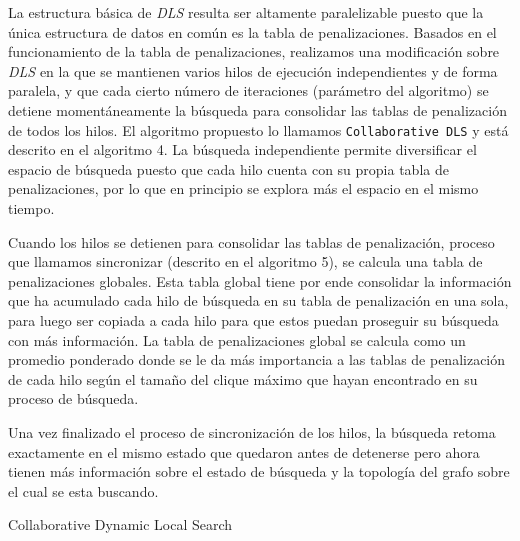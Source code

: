 \documentclass[conference]{IEEEtran}
\begin{document}
La estructura básica de \emph{DLS} resulta ser altamente paralelizable
puesto que la única estructura de datos en común es la tabla de
penalizaciones. Basados en el funcionamiento de la tabla de
penalizaciones, realizamos una modificación sobre \emph{DLS} en la
que se mantienen varios hilos de ejecución independientes y de forma
paralela, y que cada cierto número de iteraciones (parámetro del
algoritmo) se detiene momentáneamente la búsqueda para consolidar las
tablas de penalización de todos los hilos. El algoritmo propuesto lo
llamamos \texttt{Collaborative DLS} y está descrito en el algoritmo
4. La búsqueda independiente permite diversificar el espacio de
búsqueda puesto que cada hilo cuenta con su propia tabla de
penalizaciones, por lo que en principio se explora más el espacio en
el mismo tiempo.

Cuando los hilos se detienen para consolidar las tablas de
penalización, proceso que llamamos sincronizar (descrito en el
algoritmo 5), se calcula una tabla de penalizaciones globales. Esta
tabla global tiene por ende consolidar la información que ha acumulado
cada hilo de búsqueda en su tabla de penalización en una sola, para
luego ser copiada a cada hilo para que estos puedan proseguir su
búsqueda con más información. La tabla de penalizaciones global se
calcula como un promedio ponderado donde se le da más importancia a
las tablas de penalización de cada hilo según el tamaño del clique
máximo que hayan encontrado en su proceso de búsqueda.

Una vez finalizado el proceso de sincronización de los hilos, la
búsqueda retoma exactamente en el mismo estado que quedaron antes de
detenerse pero ahora tienen más información sobre el estado de
búsqueda y la topología del grafo sobre el cual se esta buscando.

\begin{scriptsize}
\LinesNumbered
\begin{algoritmo}[htp]
\label{cdls:algo}

 \caption{Collaborative Dynamic Local Search}
  \DontPrintSemicolon
\end{algoritmo}
\end{scriptsize}
\end{document}
